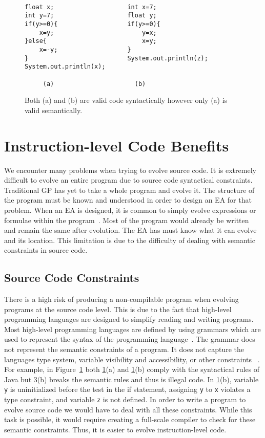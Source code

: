 \documentclass{sig-alternate}
\begin{document}
\begin{figure}
\centering
{\tt
\begin{verbatim}
float x;                    int x=7;
int y=7;                    float y;
if(y>=0){                   if(y>=0){
    x=y;                        y=x;
}else{                          x=y;
    x=-y;                   }
}                           System.out.println(z);
System.out.println(x);	
     
     (a)                      (b)

\end{verbatim}
}
\caption{Both (a) and (b) are valid code syntactically however only (a) is valid semantically.}
\label{semantics}
\end{figure}



\section{Instruction-level Code Benefits}

We encounter many problems when trying to evolve source code. It is extremely difficult to evolve an entire program due to source code syntactical constraints. Traditional GP has yet to take a whole program and evolve it. The structure of the program must be known and understood in order to design an EA for that problem. When an EA is designed, it is common to simply evolve expressions or formulae within the program~\cite{FINCH:2011}. Most of the program would already be written and remain the same after evolution. The EA has must know what it can evolve and its location. This limitation is due to the difficulty of dealing with semantic constraints in source code.

\subsection{Source Code Constraints}
There is a high risk of producing a non-compilable program when evolving programs at the source code level. This is due to the fact that high-level programming languages are designed to simplify reading and writing programs. Most high-level programming languages are defined by using grammars which are used to represent the syntax of the programming language~\cite{Oracle:2013,Assembly:2010}. The grammar does not represent the semantic constraints of a program. It does not capture the languages type system, variable visibility and accessibility, or other constraints ~\cite{FINCH:2011}. For example, in Figure~\ref{semantics} both \ref{semantics}(a) and \ref{semantics}(b) comply with the syntactical rules of Java but 3(b) breaks the semantic rules and thus is illegal code. In \ref{semantics}(b), variable \texttt{y} is uninitialized before the test in the if statement, assigning \texttt{y} to \texttt{x} violates a type constraint, and variable \texttt{z} is not defined. In order to write a program to evolve source code we would have to deal with all these constraints. While this task is possible, it would require creating a full-scale compiler to check for these semantic constraints. Thus, it is easier to evolve instruction-level code. \par
\end{document}
